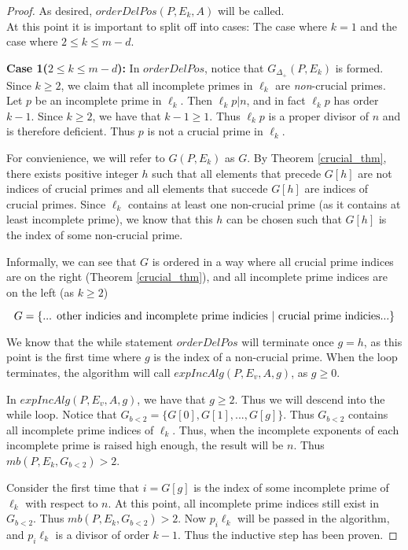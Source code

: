 \documentclass[../paper.tex]{subfiles}
\begin{document}
\begin{proof}
As desired, $orderDelPos(P, E_k, A)$ will be called.
\\
 
At this point it is important to split off into cases: The case
where $k = 1$ and the case where $2 \leq k \leq m - d$.

\textbf{Case 1($2 \leq k \leq m - d$):} In $orderDelPos$, notice 
that $G_{\Delta_+}(P,E_k)$ is formed. Since $k \geq 2$, we claim that
all incomplete primes in $\ell_k$ are \textit{non}-crucial primes.
Let $p$ be an incomplete prime in $\ell_k$. Then $\ell_k p | n$,
and in fact $\ell_k p$ has order $k - 1$. Since $k \geq 2$, we
have that $k - 1 \geq 1$. Thus $\ell_k p$ is a proper divisor of
$n$ and is therefore deficient. Thus $p$ is not a crucial prime in
$\ell_k$.

For convienience, we will refer to $G(P,E_k)$ as $G$. By Theorem
{\ref{crucial_thm}}, there exists positive integer $h$ such that
all elements that precede $G[h]$ are not indices of crucial primes
and all elements that succede $G[h]$ are indices of crucial
primes. Since $\ell_k$ contains at least one non-crucial prime (as
it contains at least incomplete prime), we know that this $h$ can
be chosen such that $G[h]$ is the index of some non-crucial prime.

Informally, we can see that $G$ is ordered in a way where all 
crucial prime indices are on the right (Theorem {\ref{crucial_thm}}), 
and all incomplete prime indices are on the left (as $k \geq 2$)

$$ G = \{ \text{... other indicies and incomplete prime indicies 
$ | $ crucial prime indicies...} \} $$

We know that the while statement
$orderDelPos$ will terminate once $g = h$, as this point is the
first time where $g$ is the index of a non-crucial prime. When
the loop terminates, the algorithm will call $expIncAlg(P,E_v, A,
g)$, as $g \geq 0$. 

In $expIncAlg(P,E_v,A, g)$, we have that $g \geq 2$. Thus we will
descend into the while loop. Notice that $G_{b<2} = \{G[0], G[1], 
..., G[g]\}$. Thus $G_{b<2}$ contains all incomplete prime indices
of $\ell_k$. Thus, when the incomplete exponents of each incomplete 
prime is raised high enough, the result will be $n$. 
Thus $mb(P,E_k, G_{b<2}) > 2$.

Consider the first time that $i = G[g]$ is the index of some
incomplete prime of $\ell_k$ with respect to $n$. At this point, 
all incomplete prime indices still exist in $G_{b<2}$. 
Thus $mb(P, E_k, G_{b<2}) > 2$. 
Now $p_i \ell_k$ will be passed in the algorithm, and $p_i \ell_k$
is a divisor of order $k-1$. Thus the inductive step has been proven.


\end{proof}
\end{document}
